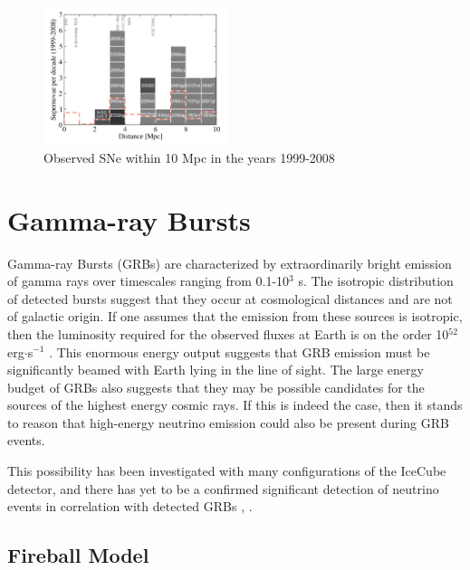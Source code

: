 \documentclass{gatech-thesis}
\begin{document}
\begin{figure}
  \begin{center}
    \includegraphics[width=0.48\textwidth,keepaspectratio]{NearbySNCatalogue.png}
  \end{center}
  \caption{Observed SNe within 10 Mpc in the years 1999-2008 \cite{2011PhRvD..83l3008K}}
  \label{fig:local_ccsne}
\end{figure}


\section{Gamma-ray Bursts}
Gamma-ray Bursts (GRBs) are characterized by extraordinarily bright emission of gamma rays over timescales ranging from 0.1-10$^3$ s. The isotropic distribution of detected bursts suggest that they occur at cosmological distances and are not of galactic origin. If one assumes that the emission from these sources is isotropic, then the luminosity required for the observed fluxes at Earth is on the order 10$^{52}$ erg$\cdot$s$^{-1}$ \cite{2004RvMP...76.1143P}. This enormous energy output suggests that GRB emission must be significantly beamed with Earth lying in the line of sight. The large energy budget of GRBs also suggests that they may be possible candidates for the sources of the highest energy cosmic rays. If this is indeed the case, then it stands to reason that high-energy neutrino emission could also be present during GRB events.

This possibility has been investigated with many configurations of the IceCube detector, and there has yet to be a confirmed significant detection of neutrino events in correlation with detected GRBs \cite{2011PhRvL.106n1101A}, \cite{2012Natur.484..351I}.
\subsection{Fireball Model}
\end{document}
